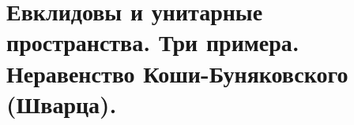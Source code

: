 \section{
    Евклидовы и унитарные пространства. Три примера. Неравенство Коши-Буняковского (Шварца).
}




\newpage





\newpage




